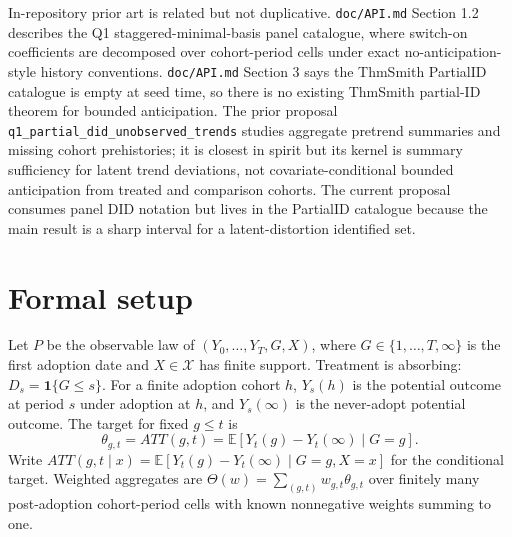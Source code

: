 \documentclass[11pt]{article}
\newcommand{\E}{\mathbb{E}}
\newcommand{\one}{\mathbf{1}}
\theoremstyle{definition}
\theoremstyle{plain}
\theoremstyle{remark}
\begin{document}
In-repository prior art is related but not duplicative.  \texttt{doc/API.md} Section 1.2 describes the Q1 staggered-minimal-basis panel catalogue, where switch-on coefficients are decomposed over cohort-period cells under exact no-anticipation-style history conventions.  \texttt{doc/API.md} Section 3 says the ThmSmith PartialID catalogue is empty at seed time, so there is no existing ThmSmith partial-ID theorem for bounded anticipation.  The prior proposal \texttt{q1\_partial\_did\_unobserved\_trends} studies aggregate pretrend summaries and missing cohort prehistories; it is closest in spirit but its kernel is summary sufficiency for latent trend deviations, not covariate-conditional bounded anticipation from treated and comparison cohorts.  The current proposal consumes panel DID notation but lives in the PartialID catalogue because the main result is a sharp interval for a latent-distortion identified set.

\section{Formal setup}
Let \(P\) be the observable law of \((Y_0,\ldots,Y_T,G,X)\), where \(G\in\{1,\ldots,T,\infty\}\) is the first adoption date and \(X\in\mathcal{X}\) has finite support.  Treatment is absorbing: \(D_s=\one\{G\le s\}\).  For a finite adoption cohort \(h\), \(Y_s(h)\) is the potential outcome at period \(s\) under adoption at \(h\), and \(Y_s(\infty)\) is the never-adopt potential outcome.  The target for fixed \(g\le t\) is
\[
  \theta_{g,t}=ATT(g,t)=\E[Y_t(g)-Y_t(\infty)\mid G=g].
\]
Write \(ATT(g,t\mid x)=\E[Y_t(g)-Y_t(\infty)\mid G=g,X=x]\) for the conditional target.
Weighted aggregates are \(\Theta(w)=\sum_{(g,t)}w_{g,t}\theta_{g,t}\) over finitely many post-adoption cohort-period cells with known nonnegative weights summing to one.
\end{document}
